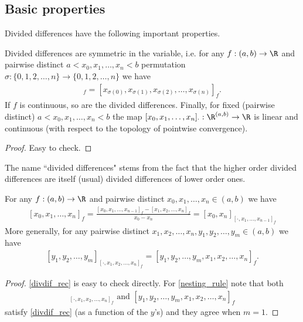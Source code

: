 \subsection{Basic properties}

Divided differences have the following important properties.

\begin{prop}
	Divided differences are symmetric in the variable, i.e. for any $f : (a, b) \to \R$ and pairwise distinct $a < x_{0}, x_{1}, \ldots, x_{n} < b$ permutation $\sigma : \{0, 1, 2, \ldots, n\} \to \{0, 1, 2, \ldots, n\}$ we have
	\begin{align*}
		[x_{0}, x_{1}, x_{2}, \ldots, x_{n}]_{f} = [x_{\sigma(0)}, x_{\sigma(1)}, x_{\sigma(2)}, \ldots, x_{\sigma(n)}]_{f}.
	\end{align*}
	If $f$ is continuous, so are the divided differences.
	Finally, for fixed (pairwise distinct) $a < x_{0}, x_{1}, \ldots, x_{n} < b$ the map $[x_{0}, x_{1}, \ldots, x_{n}]_{\cdot} : \R^{(a, b)} \to \R$ is linear and continuous (with respect to the topology of pointwise convergence).
\end{prop}
\begin{proof}
	Easy to check.
\end{proof}

The name ``divided differences" stems from the fact that the higher order divided differences are itself (usual) divided differences of lower order ones.

\begin{prop}\label{nesting_property}
	For any $f : (a, b) \to \R$ and pairwise distinct $x_{0}, x_{1}, \ldots, x_{n} \in (a, b)$ we have
	\begin{align}\label{divdif_rec}
		[x_{0}, x_{1}, \ldots, x_{n}]_{f} = \frac{[x_{0}, x_{1}, \ldots, x_{n - 1}]_{f} - [x_{1}, x_{2}, \ldots, x_{n}]_{f}}{x_{0} - x_{n}} = [x_{0}, x_{n}]_{[\cdot, x_{1}, \ldots, x_{n - 1}]_f}
	\end{align}
	More generally, for any pairwise distinct $x_{1}, x_{2}, \ldots, x_{n}, y_{1}, y_{2}, \ldots, y_{m} \in (a, b)$ we have
	\begin{align}\label{nesting_rule}
		[y_{1}, y_{2}, \ldots, y_{m}]_{[\cdot, x_{1}, x_{2}, \ldots, x_{n}]_{f}} = [y_{1}, y_{2}, \ldots, y_{m}, x_{1}, x_{2}, \ldots, x_{n}]_{f}.
	\end{align}
\end{prop}
\begin{proof}
	\ref{divdif_rec} is easy to check directly. For \ref{nesting_rule} note that both
	\begin{align*}
		[y_{1}, y_{2}, \ldots, y_{m}]_{[\cdot, x_{1}, x_{2}, \ldots, x_{n}]_{f}} \text{ and } [y_{1}, y_{2}, \ldots, y_{m}, x_{1}, x_{2}, \ldots, x_{n}]_{f}
	\end{align*}
	satisfy \ref{divdif_rec} (as a function of the $y$'s) and they agree when $m = 1$.
\end{proof}

